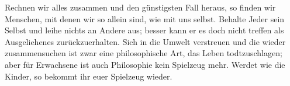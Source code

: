 Rechnen wir alles zusammen und den günstigsten Fall heraus, so finden wir Menschen, mit denen wir so allein sind, wie mit uns selbst. Behalte Jeder sein Selbst und leihe nichts an Andere aus; besser kann er es doch nicht treffen als Ausgeliehenes zurückzuerhalten. Sich in die Umwelt verstreuen und die  wieder zusammensuchen ist zwar eine philosophische Art, das Leben todtzuschlagen; aber für Erwachsene ist auch Philosophie kein Spielzeug mehr. Werdet wie die Kinder, so bekommt ihr euer Spielzeug wieder.
\par


